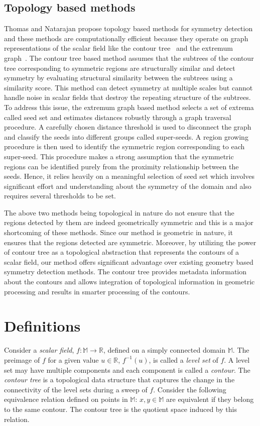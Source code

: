 \documentclass[review,journal]{vgtc}         %
\begin{document}
\subsection{Topology based methods}
Thomas and Natarajan propose topology based methods for symmetry detection and these methods 
are computationally efficient because they operate on graph representations of the scalar field
like the contour tree~\cite{} and the extremum graph~\cite{}. The contour tree based method 
assumes that the subtrees of the contour tree corresponding to symmetric regions are structurally
similar and detect symmetry by evaluating structural similarity between the subtrees using a 
similarity score. This method can detect symmetry at multiple scales but cannot handle
noise in scalar fields that destroy the repeating structure of the subtrees. To address
this issue, the extremum graph based method selects a set of extrema called seed set and 
estimates distances robustly through a graph traversal procedure. A carefully chosen distance 
threshold is used to disconnect the graph and classify the seeds into different groups called 
super-seeds. A region growing procedure is then used to identify the symmetric region 
corresponding to each super-seed. This procedure makes a strong assumption that the symmetric regions
can be identified purely from the proximity relationship between the seeds. Hence,
it relies heavily on a meaningful selection of seed set which involves significant effort 
and understanding about the symmetry of the domain and also requires several thresholds
to be set.

The above two methods being topological in nature do not ensure that the regions detected by
them are indeed geometrically symmetric and this is a major shortcoming of these methods.
Since our method is geometric in nature, it ensures that the regions detected are symmetric.
Moreover, by utilizing the power of contour tree as a topological abstraction that represents
the contours of a scalar field, our method offers significant advantage over existing geometry
based symmetry detection methods. The contour tree provides metadata information about the contours
and allows integration of topological information in geometric processing and results in smarter
processing of the contours.
\section{Definitions}
Consider a \emph{scalar field}, $f : \mathbb{M}  \rightarrow \mathbb{R}$, defined on a 
simply connected domain $\mathbb{M}$. The preimage of $f$ for a given value $u \in \mathbb{R}$, 
$f^{-1}(u)$, is called a \emph{level set} of $f$. A level set may have multiple components
and each component is called a \emph{contour}. The \emph{contour tree} is a topological 
data structure that captures the change in the connectivity of the level sets during a 
sweep of $f$. Consider the following equivalence relation defined on points in $\mathbb{M}$: $x,y 
\in \mathbb{M}$ are equivalent if they belong to the same contour. The contour
tree is the quotient space induced by this relation. 
\end{document}
